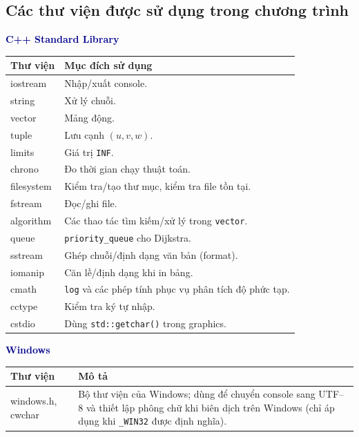 \documentclass[14pt,a4paper]{report}
\begin{document}
\subsection{Các thư viện được sử dụng trong chương trình}
\textbf{\textcolor{darkblue}{C++ Standard Library}}
\begin{table}[h!]
\centering
\renewcommand{\arraystretch}{1.2}
\begin{tabularx}{\linewidth}{|>{\ttfamily}l|X|}
\hline
\textnormal{\textbf{Thư viện}} & \textbf{Mục đích sử dụng} \\ \hline
iostream   & Nhập/xuất console. \\ \hline
string     & Xử lý chuỗi. \\ \hline
vector     & Mảng động. \\ \hline
tuple      & Lưu cạnh $(u, v, w)$. \\ \hline
limits     & Giá trị \texttt{INF}. \\ \hline
chrono     & Đo thời gian chạy thuật toán. \\ \hline
filesystem & Kiểm tra/tạo thư mục, kiểm tra file tồn tại. \\ \hline
fstream    & Đọc/ghi file. \\ \hline
algorithm  & Các thao tác tìm kiếm/xử lý trong \texttt{vector}. \\ \hline
queue      & \texttt{priority\_queue} cho Dijkstra. \\ \hline
sstream    & Ghép chuỗi/định dạng văn bản (format). \\ \hline
iomanip    & Căn lề/định dạng khi in bảng. \\ \hline
cmath      & \texttt{log} và các phép tính phục vụ phân tích độ phức tạp. \\ \hline
cctype     & Kiểm tra ký tự nhập. \\ \hline
cstdio     & Dùng \texttt{std::getchar()} trong graphics. \\ \hline
\end{tabularx}
\end{table}


\textbf{\textcolor{darkblue}{Windows}}  \\
\renewcommand{\arraystretch}{1.2}
\begin{tabularx}{\linewidth}{|>{\ttfamily}l|X|}
\hline
\textnormal{\textbf{Thư viện}} & \textbf{Mô tả} \\ \hline
windows.h, cwchar & Bộ thư viện của Windows; dùng để chuyển console sang UTF--8 và thiết lập phông chữ khi biên dịch trên Windows (chỉ áp dụng khi \texttt{\_WIN32} được định nghĩa). \\ \hline
\end{tabularx}
\end{document}
